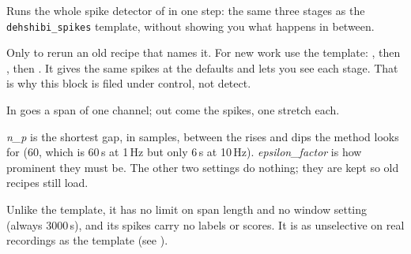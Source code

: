 Runs the whole spike detector of \citet{dehshibi2021electrical} in one step: the same three
stages as the \texttt{dehshibi\_spikes} template, without showing you what happens in between.

Only to rerun an old recipe that names it. For new work use the template:
, then , then
. It gives the same spikes at the defaults and lets you
see each stage. That is why this block is filed under control, not detect.

In goes a span of one channel; out come the spikes, one stretch each.

\emph{n\_p} is the shortest gap, in samples, between the rises and dips the method looks for
(60, which is 60\,s at 1\,Hz but only 6\,s at 10\,Hz). \emph{epsilon\_factor} is how prominent
they must be. The other two settings do nothing; they are kept so old recipes still load.

Unlike the template, it has no limit on span length and no window setting (always 3000\,s), and
its spikes carry no labels or scores. It is as unselective on real recordings as the template
(see ).

